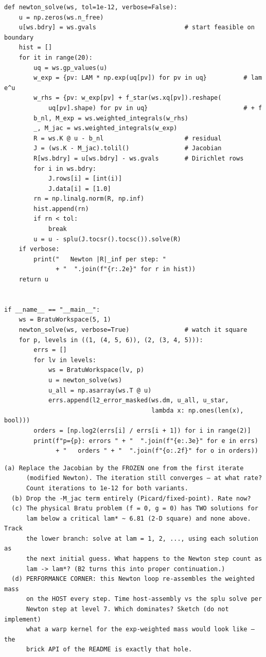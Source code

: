 \begin{lstlisting}
def newton_solve(ws, tol=1e-12, verbose=False):
    u = np.zeros(ws.n_free)
    u[ws.bdry] = ws.gvals                        # start feasible on boundary
    hist = []
    for it in range(20):
        uq = ws.gp_values(u)
        w_exp = {pv: LAM * np.exp(uq[pv]) for pv in uq}          # lam e^u
        w_rhs = {pv: w_exp[pv] + f_star(ws.xq[pv]).reshape(
            uq[pv].shape) for pv in uq}                          # + f
        b_nl, M_exp = ws.weighted_integrals(w_rhs)
        _, M_jac = ws.weighted_integrals(w_exp)
        R = ws.K @ u - b_nl                      # residual
        J = (ws.K - M_jac).tolil()               # Jacobian
        R[ws.bdry] = u[ws.bdry] - ws.gvals       # Dirichlet rows
        for i in ws.bdry:
            J.rows[i] = [int(i)]
            J.data[i] = [1.0]
        rn = np.linalg.norm(R, np.inf)
        hist.append(rn)
        if rn < tol:
            break
        u = u - splu(J.tocsr().tocsc()).solve(R)
    if verbose:
        print("   Newton |R|_inf per step: "
              + "  ".join(f"{r:.2e}" for r in hist))
    return u


if __name__ == "__main__":
    ws = BratuWorkspace(5, 1)
    newton_solve(ws, verbose=True)               # watch it square
    for p, levels in ((1, (4, 5, 6)), (2, (3, 4, 5))):
        errs = []
        for lv in levels:
            ws = BratuWorkspace(lv, p)
            u = newton_solve(ws)
            u_all = np.asarray(ws.T @ u)
            errs.append(l2_error_masked(ws.dm, u_all, u_star,
                                        lambda x: np.ones(len(x), bool)))
        orders = [np.log2(errs[i] / errs[i + 1]) for i in range(2)]
        print(f"p={p}: errors " + "  ".join(f"{e:.3e}" for e in errs)
              + "   orders " + "  ".join(f"{o:.2f}" for o in orders))
\end{lstlisting}

\begin{explore}
\begin{verbatim}
(a) Replace the Jacobian by the FROZEN one from the first iterate
      (modified Newton). The iteration still converges — at what rate?
      Count iterations to 1e-12 for both variants.
  (b) Drop the -M_jac term entirely (Picard/fixed-point). Rate now?
  (c) The physical Bratu problem (f = 0, g = 0) has TWO solutions for
      lam below a critical lam* ~ 6.81 (2-D square) and none above. Track
      the lower branch: solve at lam = 1, 2, ..., using each solution as
      the next initial guess. What happens to the Newton step count as
      lam -> lam*? (B2 turns this into proper continuation.)
  (d) PERFORMANCE CORNER: this Newton loop re-assembles the weighted mass
      on the HOST every step. Time host-assembly vs the splu solve per
      Newton step at level 7. Which dominates? Sketch (do not implement)
      what a warp kernel for the exp-weighted mass would look like — the
      brick API of the README is exactly that hole.
\end{verbatim}
\end{explore}
